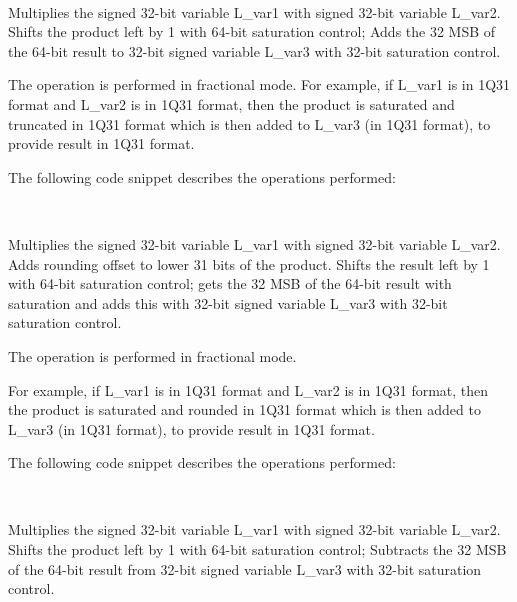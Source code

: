 \\


Multiplies the signed 32-bit variable L\_var1 with signed 32-bit variable L\_var2.
Shifts the product left by 1 with 64-bit saturation control; Adds the 32 MSB of the 64-bit result to 32-bit signed variable L\_var3 with 32-bit saturation control.

The operation is performed in fractional mode.
For example, if L\_var1 is in 1Q31 format and L\_var2 is in 1Q31 format, then the product is saturated and truncated in 1Q31 format which is then added to L\_var3 (in 1Q31 format), to provide result in 1Q31 format.

The following code snippet describes the operations performed:

\\


Multiplies the signed 32-bit variable L\_var1 with signed 32-bit variable L\_var2.
Adds rounding offset to lower 31 bits of the product.
Shifts the result left by 1 with 64-bit saturation control;
gets the 32 MSB of the 64-bit result with saturation and adds this with 32-bit signed variable L\_var3 with 32-bit saturation control.

The operation is performed in fractional mode.

For example, if L\_var1 is in 1Q31 format and L\_var2 is in 1Q31 format, then the product is saturated and rounded in 1Q31 format which is then added to L\_var3 (in 1Q31 format), to provide result in 1Q31 format.

The following code snippet describes the operations performed:

\\


Multiplies the signed 32-bit variable L\_var1 with signed 32-bit variable L\_var2.
Shifts the product left by 1 with 64-bit saturation control;
Subtracts the 32 MSB of the 64-bit result from 32-bit signed variable L\_var3 with 32-bit saturation control.

